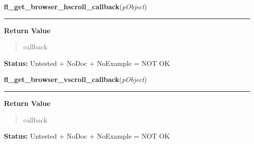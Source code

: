     \label{xformslib:library:fl_get_browser_hscroll_callback}

    \vspace{0.5ex}

\hspace{.8\funcindent}\begin{boxedminipage}{\funcwidth}

    \raggedright \textbf{fl\_get\_browser\_hscroll\_callback}(\textit{pObject})

    \vspace{-1.5ex}

    \rule{\textwidth}{0.5\fboxrule}
\setlength{\parskip}{2ex}
\setlength{\parskip}{1ex}
      \textbf{Return Value}
    \vspace{-1ex}

      \begin{quote}
      callback

      \end{quote}

\textbf{Status:} Untested + NoDoc + NoExample = NOT OK



    \end{boxedminipage}

    \label{xformslib:library:fl_get_browser_vscroll_callback}

    \vspace{0.5ex}

\hspace{.8\funcindent}\begin{boxedminipage}{\funcwidth}

    \raggedright \textbf{fl\_get\_browser\_vscroll\_callback}(\textit{pObject})

    \vspace{-1.5ex}

    \rule{\textwidth}{0.5\fboxrule}
\setlength{\parskip}{2ex}
\setlength{\parskip}{1ex}
      \textbf{Return Value}
    \vspace{-1ex}

      \begin{quote}
      callback

      \end{quote}

\textbf{Status:} Untested + NoDoc + NoExample = NOT OK



    \end{boxedminipage}

